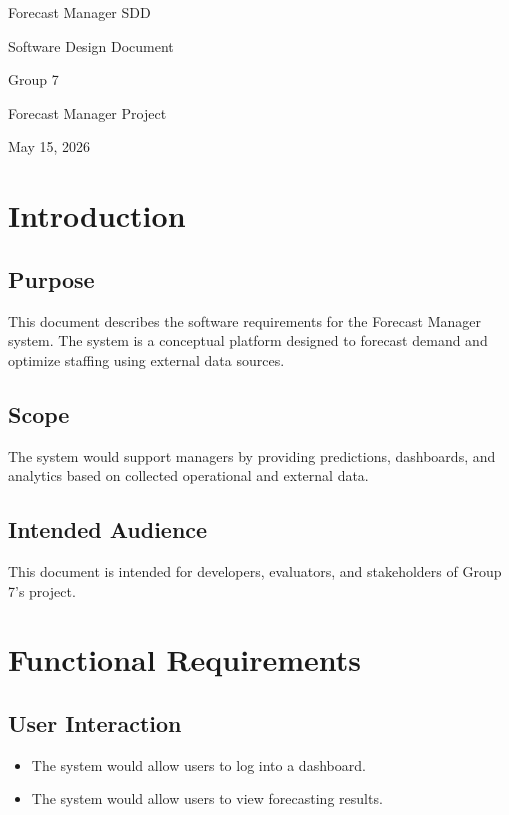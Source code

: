 \documentclass[12pt]{report}
\begin{document}
\begin{titlepage}
\centering
\vspace*{1in}

{\Huge Forecast Manager SDD \par}
\vspace{0.5in}

{\Large Software Design Document \par}
\vspace{1in}

{\Large Group 7 \par}
\vspace{0.5in}

{\large Forecast Manager Project \par}
\vfill

{\large May 15, 2026 \par}
\end{titlepage}

\clearpage
\tableofcontents
\clearpage

\section{Introduction}
\subsection{Purpose}
This document describes the software requirements for the Forecast Manager system. The system is a conceptual platform designed to forecast demand and optimize staffing using external data sources.

\subsection{Scope}
The system would support managers by providing predictions, dashboards, and analytics based on collected operational and external data.

\subsection{Intended Audience}
This document is intended for developers, evaluators, and stakeholders of Group 7's project.

\section{Functional Requirements}
\subsection{User Interaction}
\begin{itemize}
    \item The system would allow users to log into a dashboard.
    \item The system would allow users to view forecasting results.
\end{itemize}
\end{document}

